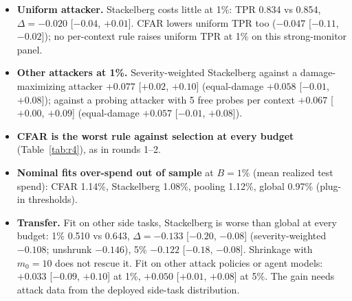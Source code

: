 \documentclass[11pt]{article}
\begin{document}
\begin{itemize}
\item \textbf{Uniform attacker.} Stackelberg costs little at 1\%: TPR 0.834 vs 0.854, $\Delta=-0.020$ [$-0.04$, $+0.01$]. CFAR lowers uniform TPR too ($-0.047$ [$-0.11$, $-0.02$]); no per-context rule raises uniform TPR at 1\% on this strong-monitor panel.
\item \textbf{Other attackers at 1\%.} Severity-weighted Stackelberg against a damage-maximizing attacker $+0.077$ [$+0.02$, $+0.10$] (equal-damage $+0.058$ [$-0.01$, $+0.08$]); against a probing attacker with 5 free probes per context $+0.067$ [$+0.00$, $+0.09$] (equal-damage $+0.057$ [$-0.01$, $+0.08$]).
\item \textbf{CFAR is the worst rule against selection at every budget} (Table~\ref{tab:r4}), as in rounds 1--2.
\item \textbf{Nominal fits over-spend out of sample} at $B=1\%$ (mean realized test spend): CFAR 1.14\%, Stackelberg 1.08\%, pooling 1.12\%, global 0.97\% (plug-in thresholds).
\item \textbf{Transfer.} Fit on other side tasks, Stackelberg is worse than global at every budget: 1\% 0.510 vs 0.643, $\Delta=-0.133$ [$-0.20$, $-0.08$] (severity-weighted $-0.108$; unshrunk $-0.146$), 5\% $-0.122$ [$-0.18$, $-0.08$]. Shrinkage with $m_0=10$ does not rescue it. Fit on other attack policies or agent models: $+0.033$ [$-0.09$, $+0.10$] at 1\%, $+0.050$ [$+0.01$, $+0.08$] at 5\%. The gain needs attack data from the deployed side-task distribution.
\end{itemize}
\end{document}
